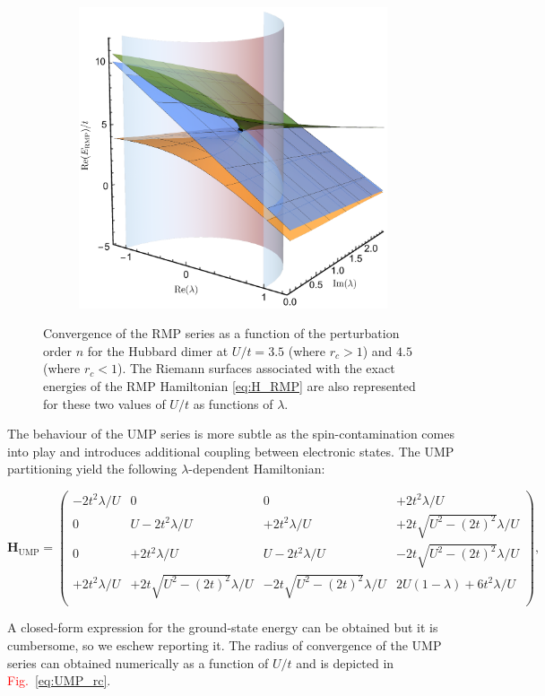 \documentclass[aps,prb,reprint,noshowkeys,superscriptaddress]{revtex4-1}
\newcommand{\titou}[1]{\textcolor{red}{#1}}
\newcommand{\bH}{\mathbf{H}}
\begin{document}
\begin{figure}
\begin{subfigure}{0.32\textwidth}
		\subcaption{\label{subfig:RMP_cvg}}
    \end{subfigure}
    \begin{subfigure}{0.32\textwidth}
	\includegraphics[height=0.75\textwidth]{fig2c}	
    \end{subfigure}
	\caption{
	Convergence of the RMP series as a function of the perturbation order $n$ for the Hubbard dimer at $U/t = 3.5$ (where $r_c > 1$) and $4.5$ (where $r_c < 1$).
	The Riemann surfaces associated with the exact energies of the RMP Hamiltonian \eqref{eq:H_RMP} are also represented for these two values of $U/t$ as functions of $\lambda$. 
	\label{fig:RMP}}
\end{figure}

The behaviour of the UMP series is more subtle as the spin-contamination comes into play and introduces additional coupling between electronic states.
The UMP partitioning yield the following $\lambda$-dependent Hamiltonian:
\begin{widetext}
\begin{equation}
\label{eq:H_UMP}
	\bH_\text{UMP} = 
	\begin{pmatrix}
		-2t^2 \lambda/U	&	0									&	0									&	+2t^2 \lambda/U		\\
		0				&	U - 2t^2 \lambda/U 					&	+2t^2\lambda/U						&	+2t \sqrt{U^2 - (2t)^2} \lambda/U	\\
		0				&	+2t^2\lambda/U						&	U - 2t^2 \lambda/U 					&	-2t \sqrt{U^2 - (2t)^2} \lambda/U	\\
		+2t^2 \lambda/U	&	+2t \sqrt{U^2 - (2t)^2} \lambda/U 	&	-2t \sqrt{U^2 - (2t)^2} \lambda/U	&	2U(1-\lambda) + 6t^2\lambda/U		\\
	\end{pmatrix},
\end{equation}
\end{widetext}
A closed-form expression for the ground-state energy can be obtained but it is cumbersome, so we eschew reporting it.
The radius of convergence of the UMP series can obtained numerically as a function of $U/t$ and is depicted in \titou{Fig.~\ref{eq:UMP_rc}}.
 
\end{document}
